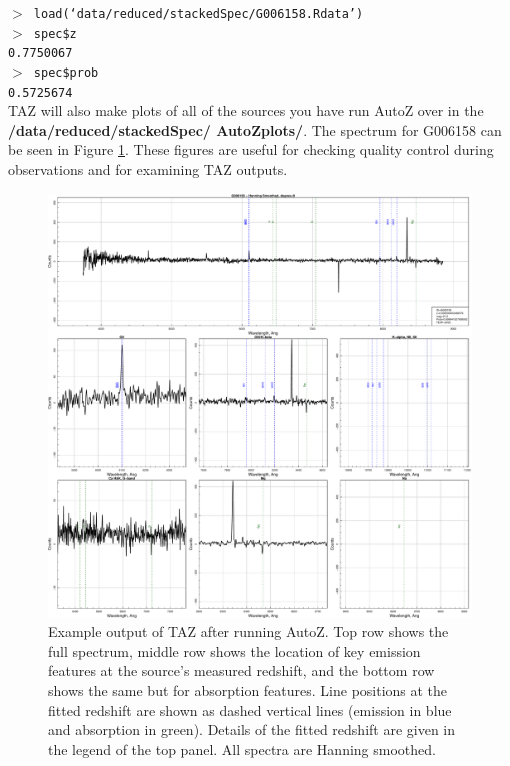 \documentclass[12pt]{article}
\begin{document}
\hspace{10mm} \texttt{$>$ load(`data/reduced/stackedSpec/G006158.Rdata')} \\

\hspace{10mm} \texttt{$>$ spec\$z} \\

\hspace{10mm} \texttt{0.7750067}\\
 
 \hspace{10mm} \texttt{$>$ spec\$prob} \\
 
 \hspace{10mm} \texttt{0.5725674}\\

TAZ will also make plots of all of the sources you have run AutoZ over in the \textbf{/data/reduced/stackedSpec/ AutoZplots/}. The spectrum for G006158 can be seen in Figure \ref{fig:specEx}. These figures are useful for checking quality control during observations and for examining TAZ outputs.

\begin{figure}
\begin{center}
\includegraphics[scale=0.4]{G006158.pdf}
\caption{Example output of TAZ after running AutoZ. Top row shows the full spectrum, middle row shows the location of key emission features at the source's measured redshift, and the bottom row shows the same but for absorption features. Line positions at the fitted redshift are shown as dashed vertical lines (emission in blue and absorption in green). Details of the fitted redshift are given in the legend of the top panel. All spectra are Hanning smoothed.}
\label{fig:specEx}
\end{center}
\end{figure}
\end{document}
